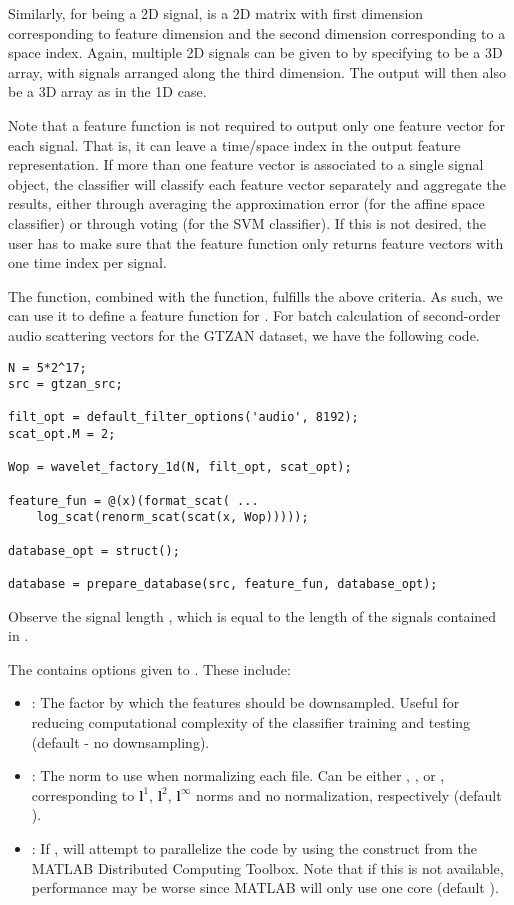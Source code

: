 \documentclass{article}
\begin{document}
Similarly, for  being a 2D signal,  is a 2D matrix with first dimension corresponding to feature dimension and the second dimension corresponding to a space index. Again, multiple 2D signals can be given to  by specifying  to be a 3D array, with signals arranged along the third dimension. The output  will then also be a 3D array as in the 1D case.

Note that a feature function is not required to output only one feature vector for each signal. That is, it can leave a time/space index in the output feature representation. If more than one feature vector is associated to a single signal object, the classifier will classify each feature vector separately and aggregate the results, either through averaging the approximation error (for the affine space classifier) or through voting (for the SVM classifier). If this is not desired, the user has to make sure that the feature function only returns feature vectors with one time index per signal.

The  function, combined with the  function, fulfills the above criteria. As such, we can use it to define a feature function for . For batch calculation of second-order audio scattering vectors for the GTZAN dataset, we have the following code.
\begin{lstlisting}
N = 5*2^17;
src = gtzan_src;

filt_opt = default_filter_options('audio', 8192);
scat_opt.M = 2;

Wop = wavelet_factory_1d(N, filt_opt, scat_opt);

feature_fun = @(x)(format_scat( ...
	log_scat(renorm_scat(scat(x, Wop)))));
	
database_opt = struct();
	
database = prepare_database(src, feature_fun, database_opt);
\end{lstlisting}
Observe the signal length , which is equal to the length of the signals contained in . 

The  contains options given to . These include:
\begin{itemize}
	\item {}: The factor by which the features should be downsampled. Useful for reducing computational complexity of the classifier training and testing (default  - no downsampling).
	\item {}: The norm to use when normalizing each file. Can be either , ,  or \mcode{[]}, corresponding to $\mathbf{l}^1$, $\mathbf{l}^2$, $\mathbf{l}^\infty$ norms and no normalization, respectively (default \mcode{[]}).
	\item {}: If ,  will attempt to parallelize the code by using the  construct from the MATLAB Distributed Computing Toolbox. Note that if this is not available, performance may be worse since MATLAB will only use one core (default ).
\end{itemize}
\end{document}
